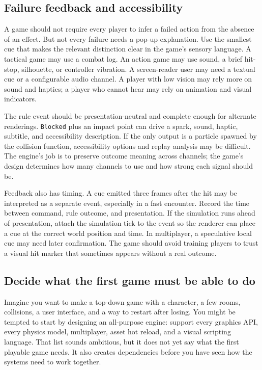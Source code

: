 \subsection{Failure feedback and accessibility}\label{05-engine-i-ch009-failure-feedback-and-accessibility}

A game should not require every player to infer a failed action from the absence of an effect. But not every failure needs a pop-up explanation. Use the smallest cue that makes the relevant distinction clear in the game's sensory language. A tactical game may use a combat log. An action game may use sound, a brief hit-stop, silhouette, or controller vibration. A screen-reader user may need a textual cue or a configurable audio channel. A player with low vision may rely more on sound and haptics; a player who cannot hear may rely on animation and visual indicators.

The rule event should be presentation-neutral and complete enough for alternate renderings. \texttt{Blocked} plus an impact point can drive a spark, sound, haptic, subtitle, and accessibility description. If the only output is a particle spawned by the collision function, accessibility options and replay analysis may be difficult. The engine's job is to preserve outcome meaning across channels; the game's design determines how many channels to use and how strong each signal should be.

Feedback also has timing. A cue emitted three frames after the hit may be interpreted as a separate event, especially in a fast encounter. Record the time between command, rule outcome, and presentation. If the simulation runs ahead of presentation, attach the simulation tick to the event so the renderer can place a cue at the correct world position and time. In multiplayer, a speculative local cue may need later confirmation. The game should avoid training players to trust a visual hit marker that sometimes appears without a real outcome.

\subsection{Decide what the first game must be able to do}\label{05-engine-i-ch009-decide-what-the-first-game-must-be-able-to-do}

Imagine you want to make a top-down game with a character, a few rooms, collisions, a user interface, and a way to restart after losing. You might be tempted to start by designing an all-purpose engine: support every graphics API, every physics model, multiplayer, asset hot reload, and a visual scripting language. That list sounds ambitious, but it does not yet say what the first playable game needs. It also creates dependencies before you have seen how the systems need to work together.

